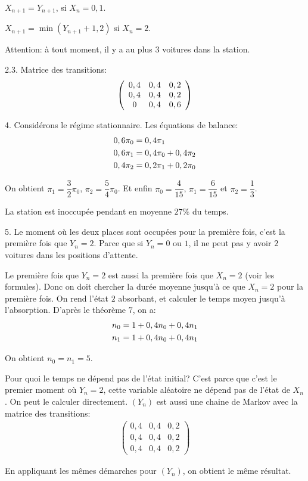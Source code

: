 \documentclass[a4paper,twoside,12pt]{article}
\begin{document}
$X_{n+1} = Y_{n+1}$, si $X_n = 0,1$.

$X_{n+1} = \min(Y_{n+1}+1, 2)$ si $X_n = 2$.

Attention: à tout moment, il y a au plus $3$ voitures dans la station.

2.3. Matrice des transitions:
\begin{align}
    \left(\begin{array}{ccc}
        0,4 & 0,4 & 0,2 \\
        0,4 & 0,4 & 0,2 \\
        0 & 0,4 & 0,6
    \end{array}\right)\notag
\end{align}

4. Considérons le régime stationnaire. Les équations de balance:
\begin{align}
    0,6\pi_0 &= 0,4\pi_1 \notag \\
    0,6\pi_1 &= 0,4\pi_0 + 0,4\pi_2 \notag \\
    0,4\pi_2 &= 0,2\pi_1 + 0,2\pi_0 \notag
\end{align}

On obtient $\pi_1 = \dfrac{3}{2}\pi_0$, $\pi_2 = \dfrac{5}{4}\pi_0$. Et enfin $\pi_0 = \dfrac{4}{15}$, $\pi_1 = \dfrac{6}{15}$ et $\pi_2 = \dfrac{1}{3}$.

La station est inoccupée pendant en moyenne $27\%$ du temps.

5. Le moment où les deux places sont occupées pour la première fois, c'est la première fois que $Y_n = 2$. Parce que si $Y_n = 0$ ou $1$, il ne peut pas y avoir $2$ voitures dans les positions d'attente.

Le première fois que $Y_n=2$ est aussi la première fois que $X_n = 2$ (voir les formules). Donc on doit chercher la durée moyenne jusqu'à ce que $X_n = 2$ pour la première fois. On rend l'état $2$ absorbant, et calculer le temps moyen jusqu'à l'absorption. D'après le théorème $7$, on a:
\begin{align}
    n_0 &= 1 + 0,4n_0 + 0,4n_1 \notag \\
    n_1 &= 1 + 0,4n_0 + 0,4n_1 \notag
\end{align}

On obtient $n_0 = n_1 = 5$.

Pour quoi le temps ne dépend pas de l'état initial? C'est parce que c'est le premier moment où $Y_n = 2$, cette variable aléatoire ne dépend pas de l'état de $X_n$. On peut le calculer directement. $(Y_n)$ est aussi une chaine de Markov avec la matrice des transitions:
\begin{align}
    \left(\begin{array}{ccc}
        0,4 & 0,4 & 0,2 \\
        0,4 & 0,4 & 0,2 \\
        0,4 & 0,4 & 0,2
    \end{array}\right)
\end{align}

En appliquant les mêmes démarches pour $(Y_n)$, on obtient le même résultat.
\end{document}
